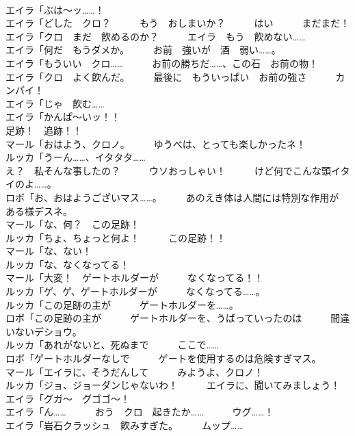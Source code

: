 \documentclass[8pt]{extreport}
\begin{document}
\begin{CJK}{UTF8}{min}
\\	エイラ「ぶは～ッ……！	
\\	エイラ「どした　クロ？　　　もう　おしまいか？　　　はい　　　まだまだ！	
\\	エイラ「クロ　まだ　飮めるのか？　　　エイラ　もう　飮めない……	
\\	エイラ「何だ　もうダメか。　　　お前　強いが　酒　弱い……。	
\\	エイラ「もういい　クロ……　　　お前の勝ちだ……、この石　お前の物！	
\\	エイラ「クロ　よく飮んだ。　　　最後に　もういっぱい　お前の強さ　　　カンパイ！	
\\	エイラ「じゃ　飮む……	
\\	エイラ「かんぱ～いッ！！	
\\	足跡！　追跡！！	
\\	マール「おはよう、クロノ。　　　ゆうべは、とっても楽しかったネ！	
\\	ルッカ「うーん……、イタタタ……	
\\	え？　私そんな事したの？　　　ウソおっしゃい！　　　けど何でこんな頭イタイのよ……。	
\\	ロボ「お、おはようございマス……。　　　あのえき体は人間には特別な作用が　　　ある様デスネ。	
\\	マール「な、何？　この足跡！	
\\	ルッカ「ちょ、ちょっと何よ！　　　この足跡！！	
\\	マール「な、ない！	
\\	ルッカ「な、なくなってる！	
\\	マール「大変！　ゲートホルダーが　　　なくなってる！！	
\\	ルッカ「ゲ、ゲ、ゲートホルダーが　　　なくなってる……。	
\\	ルッカ「この足跡の主が　　　ゲートホルダーを……。	
\\	ロボ「この足跡の主が　　　ゲートホルダーを、うばっていったのは　　　間違いないデショウ。	
\\	ルッカ「あれがないと、死ぬまで　　　ここで……	
\\	ロボ「ゲートホルダーなしで　　　ゲートを使用するのは危険すぎマス。	
\\	マール「エイラに、そうだんして　　　みようよ、クロノ！	
\\	ルッカ「ジョ、ジョーダンじゃないわ！　　　エイラに、聞いてみましょう！	
\\	エイラ「グガ～　グゴゴ～！	
\\	エイラ「ん……　　　おう　クロ　起きたか……　　　ウグ……！	
\\	エイラ「岩石クラッシュ　飮みすぎた。　　　ムップ……	

\end{CJK}
\end{document}
